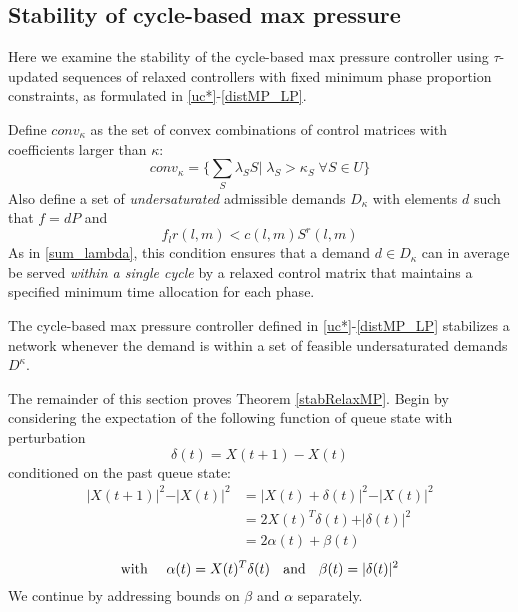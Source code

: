 \subsection*{Stability of cycle-based max pressure}
Here we examine the stability of the cycle-based max pressure controller using $\tau$-updated sequences of relaxed controllers with fixed minimum phase proportion constraints, as formulated in \eqref{uc*}-\eqref{distMP_LP}.

Define $conv_{\kappa}$ as the set of convex combinations of control matrices with coefficients larger than $\kappa$:
\begin{equation}
conv_{\kappa} = \Big\{ \sum_{S}\lambda_{S}S \big| \; \lambda_S > \kappa_S \; \forall S\in U\Big\}
\end{equation}
Also define a set of \emph{undersaturated} admissible demands $D_{\kappa}$ with elements $d$ such that $f=dP$ and 
\begin{equation}\label{admissible_relaxed}
 f_{l}r(l,m) < c(l,m)S^r(l,m) 
 \end{equation} 
As in \eqref{sum_lambda}, this condition ensures that a demand $d\in D_{\kappa}$ can in average be served \emph{within a single cycle} by a relaxed control matrix that maintains a specified minimum time allocation for each phase. 
\begin{Thm}\label{stabRelaxMP}
The cycle-based max pressure controller defined in \eqref{uc*}-\eqref{distMP_LP} 
stabilizes a network whenever the demand is within a set of feasible undersaturated demands $D^{\kappa}$.
\end{Thm}

The remainder of this section proves Theorem \ref{stabRelaxMP}. Begin by considering the expectation of the following function of queue state with perturbation 
\begin{equation} \label{delta_def}
\delta(t) = X(t+1) - X(t)
\end{equation}  
conditioned on the past queue state:
\begin{align}
\vert X(t+1) \vert^2  - \vert X(t)\vert^2 &= \vert X(t) + \delta (t) \vert^2 - \vert X(t)\vert^2 \\
\nonumber &= 2X(t)^{T}\delta(t) + \vert \delta(t)  \vert^2 \\
\nonumber &= 2\alpha(t) + \beta(t) 
\end{align}
\begin{equation} \label{alpha_beta_defs}
\text{with \quad} \alpha(t)  = X(t)^{T}\delta(t)  \text{   \; and \;  }\beta(t) = \vert \delta (t) \vert^{2}
\end{equation}
We continue by addressing bounds on $\beta$ and $\alpha$ separately. 
